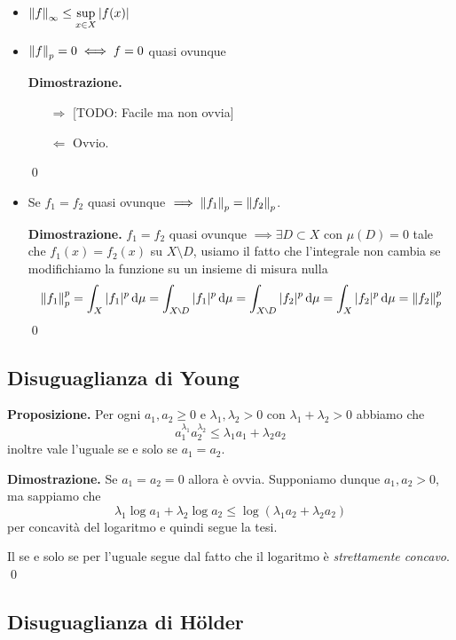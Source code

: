 \documentclass[a4paper, 12pt]{report}
\begin{document}
\begin{itemize}
	\item $\displaystyle \left\lVert f \right\rVert_\infty \leq \sup_{x \in X} |f(x)|$

	\item $\left\lVert f \right\rVert_p = 0 \iff f = 0$ quasi ovunque

		\textbf{Dimostrazione.}
		\begin{itemize}
			\item[$\boxed{\Rightarrow}$] [TODO: Facile ma non ovvia]
			\item[$\boxed{\Leftarrow}$] Ovvio.
		\end{itemize}
		\qed

	\item Se $f_1 = f_2$ quasi ovunque $\implies \left\lVert f_1 \right\rVert_p = \left\lVert f_2 \right\rVert_p$.

		\textbf{Dimostrazione.} 
		$f_1 = f_2$ quasi ovunque $\implies \exists D \subset X$ con $\mu(D) = 0$ tale che $f_1(x) = f_2(x)$ su $X \setminus D$, usiamo il fatto che l'integrale non cambia se modifichiamo la funzione su un insieme di misura nulla
		$$
		\norm{f_1}_p^p
		= \int_X |f_1|^p \dd \mu 
		= \int_{X \setminus D} |f_1|^p \dd \mu 
		= \int_{X \setminus D} |f_2|^p \dd \mu 
		= \int_{X} |f_2|^p \dd \mu 
		= \norm{f_2}_p^p
		$$ 
		\qed
\end{itemize}

\subsection{Disuguaglianza di Young}

\textbf{Proposizione.}
Per ogni $a_1, a_2 \geq 0$ e $\lambda_1, \lambda_2 > 0$ con $\lambda_1 + \lambda_2 > 0$ abbiamo che
$$
a_1^{\lambda_1} a_2^{\lambda_2} \leq \lambda_1 a_1 + \lambda_2 a_2
$$
inoltre vale l'uguale se e solo se $a_1 = a_2$.

\textbf{Dimostrazione.}
Se $a_1 = a_2 = 0$ allora è ovvia. Supponiamo dunque $a_1, a_2 > 0$, ma sappiamo che 
$$
\lambda_1 \log a_1 + \lambda_2 \log a_2 \leq \log(\lambda_1 a_2 + \lambda_2 a_2)
$$
per concavità del logaritmo e quindi segue la tesi.

Il se e solo se per l'uguale segue dal fatto che il logaritmo è \textit{strettamente concavo}. 
\qed

\subsection{Disuguaglianza di H\"older}
\end{document}
